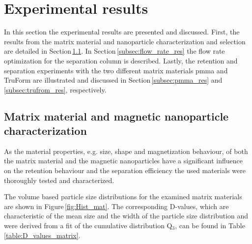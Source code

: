 %   

\section{Experimental results}
\label{sec:exp_res}
In this section the experimental results are presented and discussed. First, the results from the matrix material and nanoparticle characterization and selection are detailed in Section\,\ref{subsec:mat_mag_char_res}. In Section\,\ref{subsec:flow_rate_res} the flow rate optimization for the separation column is described. Lastly, the retention and separation experiments with the two different matrix materials \gls{pmma} and TruForm are illustrated and discussed in Section\,\ref{subsec:pmma_res} and \ref{subsec:trufrom_res}, respectively.  

\subsection{Matrix material and magnetic nanoparticle characterization}
\label{subsec:mat_mag_char_res}

As the material properties, e.g. size, shape and magnetization behaviour, of both the matrix material and the magnetic nanoparticles have a significant influence on the retention behaviour and the separation efficiency the used materials were thoroughly tested and characterized. 

The volume based particle size distributions for the examined matrix materials are shown in Figure\,\ref{fig:Hist_mat}. The corresponding D-values, which are characteristic of the mean size and the width of the particle size distribution and were derived from a fit of the cumulative distribution Q$_{3}$, can be found in Table\,\ref{table:D_values_matrix}. 

